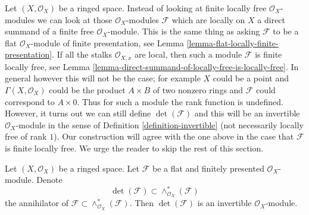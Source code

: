 \noindent
Let $(X, \mathcal{O}_X)$ be a ringed space. Instead of looking at
finite locally free $\mathcal{O}_X$-modules we can look at those
$\mathcal{O}_X$-modules $\mathcal{F}$ which are locally on $X$
a direct summand of a finite free $\mathcal{O}_X$-module. This is the same
thing as asking $\mathcal{F}$ to be a flat $\mathcal{O}_X$-module of
finite presentation, see Lemma \ref{lemma-flat-locally-finite-presentation}.
If all the stalks $\mathcal{O}_{X, x}$ are local, then such a module
$\mathcal{F}$ is finite locally free, see
Lemma \ref{lemma-direct-summand-of-locally-free-is-locally-free}.
In general however this will not be the case; for
example $X$ could be a point and $\Gamma(X, \mathcal{O}_X)$ could
be the product $A \times B$ of two nonzero rings and $\mathcal{F}$
could correspond to $A \times 0$.
Thus for such a module the rank function is undefined.
However, it turns out we can still define $\det(\mathcal{F})$
and this will be an invertible $\mathcal{O}_X$-module in the sense of
Definition \ref{definition-invertible} (not necessarily locally
free of rank $1$). Our construction will agree with the one above
in the case that $\mathcal{F}$ is finite locally free.
We urge the reader to skip the rest of this section.

\begin{lemma}
\label{lemma-determinant-as-socle}
Let $(X, \mathcal{O}_X)$ be a ringed space. Let $\mathcal{F}$
be a flat and finitely presented $\mathcal{O}_X$-module.
Denote
$$
\det(\mathcal{F}) \subset
\wedge^*_{\mathcal{O}_X}(\mathcal{F})
$$
the annihilator of $\mathcal{F} \subset \wedge^*_{\mathcal{O}_X}(\mathcal{F})$.
Then $\det(\mathcal{F})$ is an invertible $\mathcal{O}_X$-module.
\end{lemma}

